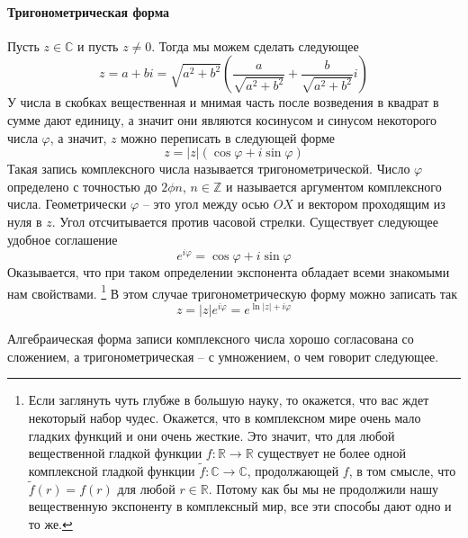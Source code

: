 \paragraph{Тригонометрическая форма}

Пусть $z\in\mathbb C$ и пусть $z\neq 0$.
Тогда мы можем сделать следующее
\[
z = a + bi = \sqrt{a^2 + b^2}\left(\frac{a}{\sqrt{a^2 + b^2}} + \frac{b}{\sqrt{a^2 + b^2}}i\right)
\]
У числа в скобках вещественная и мнимая часть после возведения в квадрат в сумме дают единицу, а значит они являются косинусом и синусом некоторого числа $\varphi$, а значит, $z$ можно переписать в следующей форме
\[
z = |z| (\cos \varphi + i\sin\varphi)
\]
Такая запись комплексного числа называется тригонометрической.
Число $\varphi$ определено с точностью до $2\phi n$, $n\in\mathbb Z$ и называется аргументом комплексного числа.
Геометрически $\varphi$ -- это угол между осью $OX$ и вектором проходящим из нуля в $z$.
Угол отсчитывается против часовой стрелки.
Существует следующее удобное соглашение
\[
e^{i\varphi} = \cos \varphi + i \sin \varphi
\]
Оказывается, что при таком определении экспонента обладает всеми знакомыми нам свойствами.%
\footnote{Если заглянуть чуть глубже в большую науку, то окажется, что вас ждет некоторый набор чудес.
Окажется, что в комплексном мире очень мало гладких функций и они очень жесткие.
Это значит, что для любой вещественной гладкой функции $f\colon \mathbb R\to \mathbb R$ существует не более одной комплексной гладкой функции $\tilde f\colon \mathbb C\to \mathbb C$, продолжающей $f$, в том смысле, что $\tilde f(r) = f(r)$ для любой $r\in \mathbb R$.
Потому как бы мы не продолжили нашу вещественную экспоненту в комплексный мир, все эти способы дают одно и то же.}
В этом случае тригонометрическую форму можно записать так
\[
z = |z| e^{i\varphi} = e^{\ln |z| + i\varphi}
\]

Алгебраическая форма записи комплексного числа хорошо согласована со сложением, а тригонометрическая -- с умножением, о чем говорит следующее.

